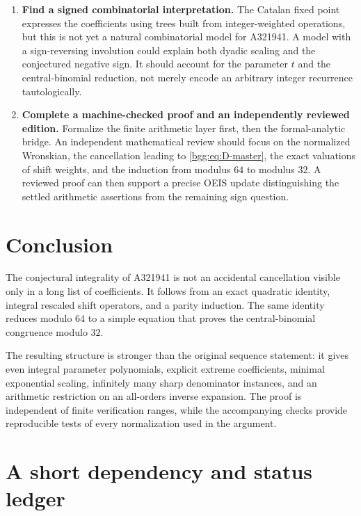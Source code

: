 \documentclass[11pt,a4paper]{article}
\numberwithin{equation}{section}
\theoremstyle{definition}
\theoremstyle{remark}
\theoremstyle{definition}
\begin{document}
\begin{enumerate}[label=\textbf{\arabic*.}]
\item \textbf{Find a signed combinatorial interpretation.}
The Catalan fixed point expresses the coefficients using trees built from
integer-weighted operations, but this is not yet a natural combinatorial
model for A321941. A model with a sign-reversing involution could explain both
dyadic scaling and the conjectured negative sign. It should account for the
parameter $t$ and the central-binomial reduction, not merely encode an
arbitrary integer recurrence tautologically.

\item \textbf{Complete a machine-checked proof and an independently reviewed edition.}
Formalize the finite arithmetic layer first, then the formal-analytic bridge.
An independent mathematical review should focus on the normalized Wronskian,
the cancellation leading to \eqref{bgg:eq:D-master}, the exact valuations of
shift weights, and the induction from modulus $64$ to modulus $32$. A
reviewed proof can then support a precise OEIS update distinguishing the
settled arithmetic assertions from the remaining sign question.
\end{enumerate}

\section{Conclusion}

The conjectural integrality of A321941 is not an accidental cancellation
visible only in a long list of coefficients. It follows from an exact
quadratic identity, integral rescaled shift operators, and a parity
induction. The same identity reduces modulo $64$ to a simple equation that
proves the central-binomial congruence modulo $32$.

The resulting structure is stronger than the original sequence statement:
it gives even integral parameter polynomials, explicit extreme coefficients,
minimal exponential scaling, infinitely many sharp denominator instances,
and an arithmetic restriction on an all-orders inverse expansion. The proof
is independent of finite verification ranges, while the accompanying checks
provide reproducible tests of every normalization used in the argument.

\appendix
\section{A short dependency and status ledger}
\end{document}
